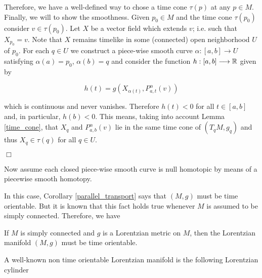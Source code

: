Therefore, we have a well-defined way to chose a time cone $\tau(p)$ at any $p \in M$. Finally, we will to show the smoothness. Given $p_0 \in M$ and the time cone $\tau(p_0)$ consider $v \in \tau(p_0)$. Let $X$ be a vector field which extends $v$; i.e. such that $X_{p_{0}}=v$. Note that $X$ remains timelike in some (connected) open neighborhood $U$ of $p_0$. For each $q \in U$ we construct a piece-wise smooth curve $\alpha : [a,b] \longrightarrow U$ satisfying $\alpha(a)=p_0$, $\alpha(b)=q$ and consider the function $h : [a,b] \longrightarrow \mathbb{R}$ given by

\[

h(t)=g(X_{\alpha(t)},P_{a,t}^{\alpha}(v))

\]

which is continuous and never vanishes. Therefore $h(t)<0$ for all $t\in [a,b]$ and, in particular, $h(b)<0$. This means, taking into account Lemma \ref{time_cone}, that $X_q$ and $P_{a,b}^{\alpha}(v)$ lie in the same time cone of $(T_qM,g_q)$ and thus $X_q \in \tau(q)$ for all $q \in U$.


\hfill{$\Box$}


Now assume each closed piece-wise smooth curve is null homotopic by means of a piecewise smooth homotopy.

In this case, Corollary \ref{parallel_transport} says that $(M,g)$ must be time orientable. But it is known that this fact holds true whenever $M$ is assumed to be simply connected. Therefore, we have


\begin{cor}\label{simply_connected}

If $M$ is simply connected and $g$ is a Lorentzian metric on $M$, then the Lorentzian manifold $(M,g)$ must be time orientable.

\end{cor}


A well-known non time orientable Lorentzian manifold is the following Lorentzian cylinder \cite[Example 1.2.3]{S-W}


